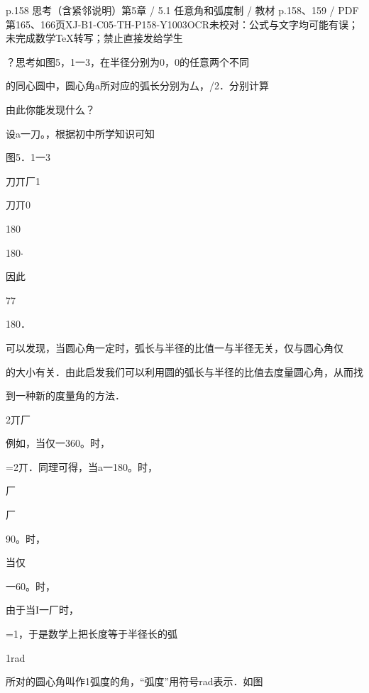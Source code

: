 \begin{bankitem}{p.158 思考（含紧邻说明）}{第5章 / 5.1 任意角和弧度制 / 教材 p.158、159 / PDF 第165、166页}{XJ-B1-C05-TH-P158-Y1003}{OCR未校对：公式与文字均可能有误；未完成数学TeX转写；禁止直接发给学生}
\begin{ocrdraft}
\par
？思考如图5，1一3，在半径分别为0，0的任意两个不同
\par
的同心圆中，圆心角a所对应的弧长分别为厶，/2．分别计算
\par
由此你能发现什么？
\par
设a一刀。，根据初中所学知识可知
\par
图5．1一3
\par
刀丌厂1
\par
刀丌0
\par
180
\par
180\ensuremath{\cdot}
\par
因此
\par
77
\par
180．
\par
可以发现，当圆心角一定时，弧长与半径的比值一与半径无关，仅与圆心角仅
\par
的大小有关．由此启发我们可以利用圆的弧长与半径的比值去度量圆心角，从而找
\par
到一种新的度量角的方法．
\par
2丌厂
\par
例如，当仅一360。时，
\par
=2丌．同理可得，当a一180。时，
\par
厂
\par
厂
\par
90。时，
\par
当仅
\par
一60。时，
\par
[教材p.159 / PDF第166页]
\par
由于当I一厂时，
\par
=1，于是数学上把长度等于半径长的弧
\par
1rad
\par
所对的圆心角叫作1弧度的角，“弧度”用符号rad表示．如图
\par

\end{ocrdraft}
\end{bankitem}
